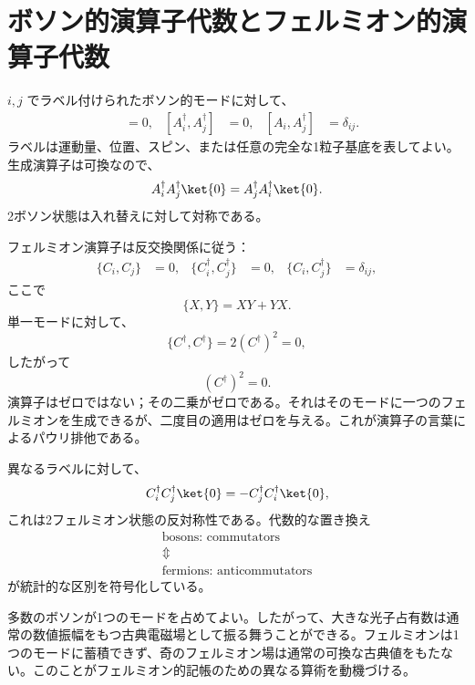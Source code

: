 \section{ボソン的演算子代数とフェルミオン的演算子代数}

\(i,j\) でラベル付けられたボソン的モードに対して、
\begin{align}
[A_i,A_j]&=0,&
[A_i^\dagger,A_j^\dagger]&=0,&
[A_i,A_j^\dagger]&=\delta_{ij}.
\end{align}
ラベルは運動量、位置、スピン、または任意の完全な1粒子基底を表してよい。生成演算子は可換なので、
\begin{equation}
A_i^\dagger A_j^\dagger\ket{0}
=A_j^\dagger A_i^\dagger\ket{0}.
\end{equation}
2ボソン状態は入れ替えに対して対称である。

フェルミオン演算子は反交換関係に従う：
\begin{align}
\{C_i,C_j\}&=0,&
\{C_i^\dagger,C_j^\dagger\}&=0,&
\{C_i,C_j^\dagger\}&=\delta_{ij},
\end{align}
ここで
\begin{equation}
\{X,Y\}=XY+YX.
\end{equation}
単一モードに対して、
\begin{equation}
\{C^\dagger,C^\dagger\}=2(C^\dagger)^2=0,
\end{equation}
したがって
\begin{equation}
(C^\dagger)^2=0.
\end{equation}
演算子はゼロではない；その二乗がゼロである。それはそのモードに一つのフェルミオンを生成できるが、二度目の適用はゼロを与える。これが演算子の言葉によるパウリ排他である。

異なるラベルに対して、
\begin{equation}
C_i^\dagger C_j^\dagger\ket{0}
=-C_j^\dagger C_i^\dagger\ket{0},
\end{equation}
これは2フェルミオン状態の反対称性である。代数的な置き換え
\begin{equation}
\begin{gathered}
\text{bosons: commutators}\\
\Updownarrow\\
\text{fermions: anticommutators}
\end{gathered}
\end{equation}
が統計的な区別を符号化している。

多数のボソンが1つのモードを占めてよい。したがって、大きな光子占有数は通常の数値振幅をもつ古典電磁場として振る舞うことができる。フェルミオンは1つのモードに蓄積できず、奇のフェルミオン場は通常の可換な古典値をもたない。このことがフェルミオン的記帳のための異なる算術を動機づける。

